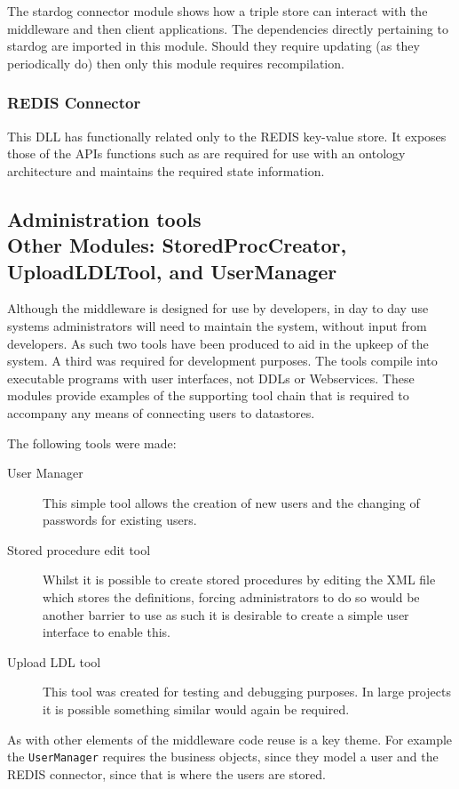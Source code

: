 The stardog connector module shows how a triple store can interact with the middleware and then client applications. The dependencies directly pertaining to stardog are imported in this module. Should they require updating (as they periodically do) then only this module requires recompilation.

\subsubsection{REDIS Connector}

This DLL has functionally related only to the REDIS key-value store. It exposes those of the APIs functions such as are required for use with an ontology architecture and maintains the required state information.

\subsection[Administration Tools]{Administration tools \\ Other Modules: StoredProcCreator, UploadLDLTool, and UserManager}
Although the middleware is designed for use by developers, in day to day use systems administrators will need to maintain the system, without input from developers. As such two tools have been produced to aid in the upkeep of the system. A third was required for development purposes. The tools compile into executable programs with user interfaces, not DDLs or Webservices. These modules provide examples of the supporting tool chain that is required to accompany any means of connecting users to datastores. 

The following tools were made:
\begin{description}
    \item[User Manager]
        This simple tool allows the creation of new users and the changing of passwords for existing users. 
    \item[Stored procedure edit tool]
     Whilst it is possible to create stored procedures by editing the XML file which stores the definitions, forcing administrators to do so would be another barrier to use as such it is desirable to create a simple user interface to enable this.
     \item[Upload LDL tool]
     This tool was created for testing and debugging purposes. In large projects it is possible something similar would again be required. 
\end{description}   

As with other elements of the middleware code reuse is a key theme. For example the \texttt{UserManager} requires the business objects, since they model a user and the REDIS connector, since that is where the users are stored. 

